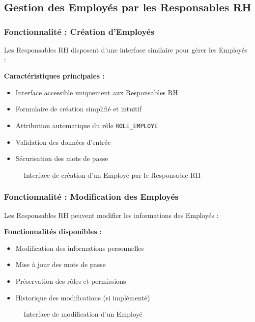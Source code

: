 \documentclass[12pt,a4paper]{article}
\begin{document}
\subsection{Gestion des Employés par les Responsables RH}

\subsubsection{Fonctionnalité : Création d'Employés}
Les Responsables RH disposent d'une interface similaire pour gérer les Employés :

\textbf{Caractéristiques principales :}
\begin{itemize}
    \item Interface accessible uniquement aux Responsables RH
    \item Formulaire de création simplifié et intuitif
    \item Attribution automatique du rôle \texttt{ROLE\_EMPLOYE}
    \item Validation des données d'entrée
    \item Sécurisation des mots de passe
\end{itemize}

\begin{figure}[H]
    \centering
    \caption{Interface de création d'un Employé par le Responsable RH}
    \label{fig:responsable_create_employe}
\end{figure}

\subsubsection{Fonctionnalité : Modification des Employés}
Les Responsables RH peuvent modifier les informations des Employés :

\textbf{Fonctionnalités disponibles :}
\begin{itemize}
    \item Modification des informations personnelles
    \item Mise à jour des mots de passe
    \item Préservation des rôles et permissions
    \item Historique des modifications (si implémenté)
\end{itemize}

\begin{figure}[H]
    \centering
    \caption{Interface de modification d'un Employé}
    \label{fig:responsable_edit_employe}
\end{figure}
\end{document}
